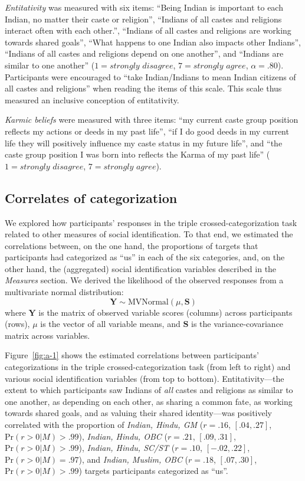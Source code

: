 \documentclass[12pt, a4paper]{article}
\begin{document}
\emph{Entitativity} \parencite{lickel_varieties_2000} was measured with six items: ``Being Indian is important to each Indian, no matter their caste or religion'', ``Indians of all castes and religions interact often with each other.'', ``Indians of all castes and religions are working towards shared goals'', ``What happens to one Indian also impacts other Indians'', ``Indians of all castes and religions depend on one another'', and ``Indians are similar to one another'' ($1 = \textit{strongly disagree}$, $7 = \textit{strongly agree}$, $\alpha = .80$). Participants were encouraged to ``take Indian/Indians to mean Indian citizens of all castes and religions'' when reading the items of this scale. This scale thus measured an inclusive conception of entitativity.

\emph{Karmic beliefs} \parencite{cotterill_ideological_2014} were measured with three items: ``my current caste group position reflects
my actions or deeds in my past life'', ``if I do good deeds in my current life they will positively influence my caste status in my future life'', and ``the caste group position I was born into reflects the Karma of my past life'' ($1 = \textit{strongly disagree}$, $7 = \textit{strongly agree}$).

\subsection{Correlates of categorization}

We explored how participants' responses in the triple crossed-categorization task related to other measures of social identification. To that end, we estimated the correlations between, on the one hand, the proportions of targets that participants had categorized as ``us'' in each of the six categories, and, on the other hand, the (aggregated) social identification variables described in the \emph{Measures} section. We derived the likelihood of the observed responses from a multivariate normal distribution: $$ \textbf{Y} \sim \text{MVNormal} (\mu , \textbf{S} ) $$ where $\textbf{Y}$ is the matrix of observed variable scores (columns) across participants (rows), $\mu$ is the vector of all variable means, and $\textbf{S}$ is the variance-covariance matrix across variables.

Figure~\ref{fig:a-1} shows the estimated correlations between participants' categorizations in the triple crossed-categorization task (from left to right) and various social identification variables (from top to bottom). Entitativity---the extent to which participants saw Indians of \emph{all} castes and religions as similar to one another, as depending on each other, as sharing a common fate, as working towards shared goals, and as valuing their shared identity---was positively correlated with the proportion of \emph{Indian, Hindu, GM} ($r = .16$, $[.04, .27]$, $\text{Pr} (r > 0|M) > .99$), \emph{Indian, Hindu, OBC} ($r = .21$, $[.09, .31]$, $\text{Pr} (r > 0| M) > .99$), \emph{Indian, Hindu, SC/ST} ($r = .10$, $[-.02, .22]$, $\text{Pr} (r > 0| M) = .97$), and \emph{Indian, Muslim, OBC} ($r = .18$, $[.07, .30]$, $\text{Pr} (r > 0| M) > .99$) targets participants categorized as ``us''.
\end{document}
